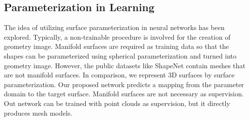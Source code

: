 \subsection{Parameterization in Learning}
The idea of utilizing surface parameterization in neural networks has been explored\cite{surfnet,geoimg}. 
Typically, a non-trainable procedure is involved for the creation of geometry image. 
Manifold surfaces are required as training data so that the shapes can be parameterized using spherical parameterization and turned into geometry image. However, the public datasets like ShapeNet\cite{shapenetdata} contain meshes that are not manifold surfaces. 
In comparison, we represent 3D surfaces by surface parameterization. 
Our proposed network predicts a mapping from the parameter domain to the target surface. Manifold surfaces are not necessary as supervision.
Out network can be trained with point clouds as supervision, but it directly produces mesh models.


